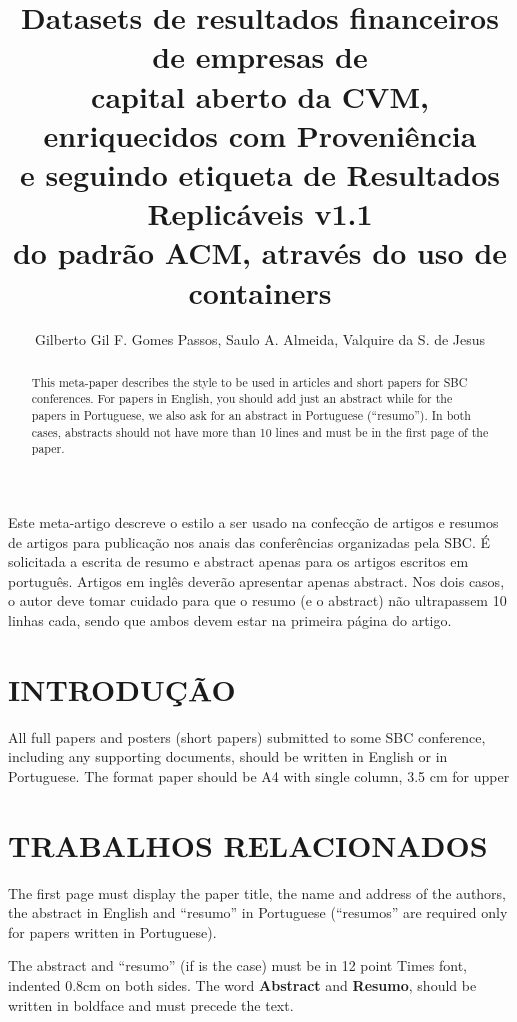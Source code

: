 \documentclass[12pt]{article}
\title{Datasets de resultados financeiros de empresas de \\
capital aberto da CVM, enriquecidos com Proveniência\\  
e seguindo etiqueta de Resultados Replicáveis v1.1\\ 
do padrão ACM, através do uso de containers}
\author{Gilberto Gil F. Gomes Passos\inst{1}, Saulo A. Almeida\inst{1}, Valquire da S. de Jesus\inst{1} }
\begin{document}
 

\maketitle

\begin{abstract}
  This meta-paper describes the style to be used in articles and short papers
  for SBC conferences. For papers in English, you should add just an abstract
  while for the papers in Portuguese, we also ask for an abstract in
  Portuguese (``resumo''). In both cases, abstracts should not have more than
  10 lines and must be in the first page of the paper.
\end{abstract}
     
\begin{resumo} 
  Este meta-artigo descreve o estilo a ser usado na confecção de artigos e
  resumos de artigos para publicação nos anais das conferências organizadas
  pela SBC. É solicitada a escrita de resumo e abstract apenas para os artigos
  escritos em português. Artigos em inglês deverão apresentar apenas abstract.
  Nos dois casos, o autor deve tomar cuidado para que o resumo (e o abstract)
  não ultrapassem 10 linhas cada, sendo que ambos devem estar na primeira
  página do artigo.
\end{resumo}


\section{INTRODUÇÃO}

All full papers and posters (short papers) submitted to some SBC conference,
including any supporting documents, should be written in English or in
Portuguese. The format paper should be A4 with single column, 3.5 cm for upper

\section{TRABALHOS RELACIONADOS} \label{sec:trabalhosrelacionados}

The first page must display the paper title, the name and address of the
authors, the abstract in English and ``resumo'' in Portuguese (``resumos'' are required only for papers written in Portuguese).

The abstract and ``resumo'' (if is the case) must be in 12 point Times font,
indented 0.8cm on both sides. The word \textbf{Abstract} and \textbf{Resumo},
should be written in boldface and must precede the text.
\end{document}
